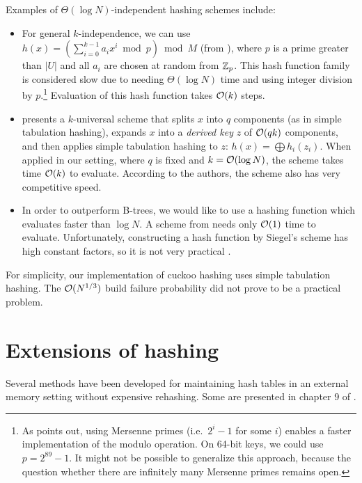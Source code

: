 Examples of $\Theta(\log N)$-independent hashing schemes include:
\begin{itemize}
\item For general $k$-independence, we can use
	$h(x)=(\sum_{i=0}^{k-1} a_i x^i \bmod p) \bmod M$ (from
	\cite{new-hash-fns}), where $p$ is a prime greater than $|U|$ and
	all $a_i$ are chosen at random from $\mathbb{Z}_p$.
	This hash function family is considered slow due to needing
	$\Theta(\log N)$ time and using integer division by $p$.\footnote{
		As \cite{univ-classes} points out, using Mersenne primes
		(i.e.\ $2^i-1$ for some $i$) enables a faster implementation of
		the modulo operation. On 64-bit keys, we could use $p=2^{89}-1$.
		It might not be possible to generalize this approach, because
		the question whether there are infinitely many Mersenne primes
		remains open.
	}
	Evaluation of this hash function takes $\mathcal{O}(k)$ steps.
\item \cite{tab-based-4uni-hashing} presents a $k$-universal scheme that splits
	$x$ into $q$ components (as in simple tabulation hashing),
	expands $x$ into a \emph{derived key} $z$ of $\mathcal{O}(qk)$ components,
	and then applies simple tabulation hashing to $z$:
	$h(x)=\bigoplus h_i(z_i)$.
	When applied in our setting, where $q$ is fixed and $k=\mathcal{O}(\log N)$,
	the scheme takes time $\mathcal{O}(k)$ to evaluate.
	According to the authors, the scheme also has very competitive speed.
\item In order to outperform B-trees, we would like to use a hashing function
	which evaluates faster than $\log N$. A scheme from \cite{siegel-1995}
	needs only $\mathcal{O}(1)$ time to evaluate. Unfortunately, constructing a hash
	function by Siegel's scheme has high constant factors, so it is not
	very practical \cite{pagh-phd}.
\end{itemize}



For simplicity, our implementation of cuckoo hashing uses simple tabulation
hashing. The $\mathcal{O}(N^{1/3})$ build failure probability did not prove to be a
practical problem.

\section{Extensions of hashing}
Several methods have been developed for maintaining hash tables in an external
memory setting without expensive rehashing. Some are presented in chapter 9
of \cite{em-ads}.

